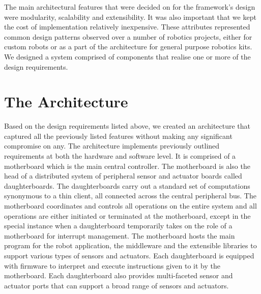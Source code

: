 

The main architectural features that were decided on for the \xten framework's design were modularity, scalability and extensibility. It was also important that we kept the cost of implementation relatively inexpensive. These attributes represented common design patterns observed over a number of robotics projects, either for custom robots or as a part of the architecture for general purpose robotics kits. We designed a system comprised of components that realise one or more of the design requirements.

\newpage
\section{The Architecture} %
\label{sec:the_architecture}
Based on the design requirements listed above, we created an architecture that captured all the previously listed features without making any significant compromise on any. The \xten architecture implements previously outlined requirements at both the hardware and software level. It is comprised of a motherboard which is the main central controller. The motherboard is also the head of a distributed system of peripheral sensor and actuator boards called daughterboards. The daughterboards carry out a standard set of computations synonymous to a thin client, all connected across the central peripheral bus. The motherboard coordinates and controls all operations on the entire system and all operations are either initiated or terminated at the motherboard, except in the special instance when a daughterboard temporarily takes on the role of a motherboard for interrupt management. The motherboard hosts the main program for the robot application, the middleware and the extensible libraries to support various types of sensors and actuators. Each daughterboard is equipped with firmware to interpret and execute instructions given to it by the motherboard. Each daughterboard also provides multi-faceted sensor and actuator ports that can support a broad range of sensors and actuators. 

